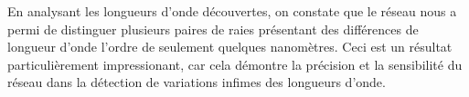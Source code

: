 \documentclass{article}
\begin{document}
En analysant les longueurs d'onde découvertes, on constate que le réseau nous a permi de distinguer plusieurs paires de 
raies présentant des différences de longueur d'onde l'ordre de seulement quelques nanomètres. 
Ceci est un résultat particulièrement impressionant, car cela démontre la précision et la sensibilité du réseau dans 
la détection de variations infimes des longueurs d'onde.
\end{document}
